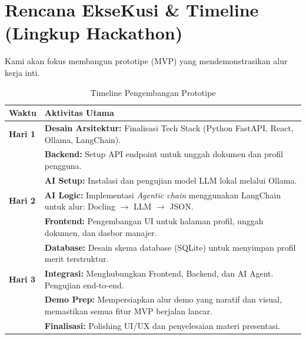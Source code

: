 \documentclass[11pt, a4paper]{article}
\begin{document}
\section{Rencana EkseKusi \& Timeline (Lingkup Hackathon)}
Kami akan fokus membangun prototipe (MVP) yang mendemonstrasikan alur kerja inti.
\begin{table}[h!]
    \centering
    \caption{Timeline Pengembangan Prototipe}
    \begin{tabularx}{\textwidth}{@{} >{\bfseries}l L @{}}
        \toprule
        Waktu & Aktivitas Utama \\
        \midrule
        Hari 1 & \textbf{Desain Arsitektur:} Finalisasi Tech Stack (Python FastAPI, React, Ollama, LangChain). \\
               & \textbf{Backend:} Setup API endpoint untuk unggah dokumen dan profil pengguna. \\
               & \textbf{AI Setup:} Instalasi dan pengujian model LLM lokal melalui Ollama. \\
        \addlinespace
        Hari 2 & \textbf{AI Logic:} Implementasi \textit{Agentic chain} menggunakan LangChain untuk alur: Docling $\rightarrow$ LLM $\rightarrow$ JSON. \\
               & \textbf{Frontend:} Pengembangan UI untuk halaman profil, unggah dokumen, dan dasbor manajer. \\
               & \textbf{Database:} Desain skema database (SQLite) untuk menyimpan profil merit terstruktur. \\
        \addlinespace
        Hari 3 & \textbf{Integrasi:} Menghubungkan Frontend, Backend, dan AI Agent. Pengujian end-to-end. \\
               & \textbf{Demo Prep:} Mempersiapkan alur demo yang naratif dan visual, memastikan semua fitur MVP berjalan lancar. \\
               & \textbf{Finalisasi:} Polishing UI/UX dan penyelesaian materi presentasi. \\
        \bottomrule
    \end{tabularx}
\end{table}

\end{document}
